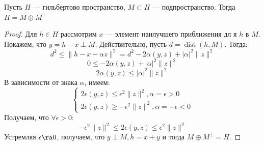 \begin{theorem}
    Пусть \(H\) --- гильбертово пространство, \(M \subset H\) --- подпространство. Тогда \(H = M \oplus M^\perp\)
\end{theorem}
\begin{proof}
    Для \(h \in H\) рассмотрим \(x\) --- элемент наилучшего приближения дл я \(h\) в \(M\). Покажем, что \(y = h - x \perp M\). Действительно, пусть \(d = \operatorname{dist}(h, M)\). Тогда:
    \[d^2 \le \|h - x - \alpha z\|^2 = d^2 - 2\alpha(y, z) + |\alpha|^2\|z\|^2\]
    \[0 \le - 2\alpha(y, z) + |\alpha|^2\|z\|^2\]
    \[2\alpha(y, z) \le |\alpha|^2\|z\|^2\]
    В зависимости от знака \(\alpha\), имеем:
    \[\begin{cases}
        2\epsilon(y, z) \le \epsilon^2\|z\|^2, \alpha = \epsilon > 0 \\
        2\epsilon(y, z) \ge -\epsilon^2\|z\|^2, \alpha = -\epsilon < 0
    \end{cases}\]
    Получаем, что \(\forall \epsilon > 0\):
    \[-\epsilon^2\|z\|^2 \le 2\epsilon(y, z) \le \epsilon^2\|z\|^2\]
    Устремляя \(\epsilon \ra 0\), получаем, что \(y \perp M, h = x + y\) и тогда \(M \oplus M^\perp = H\).
\end{proof}

